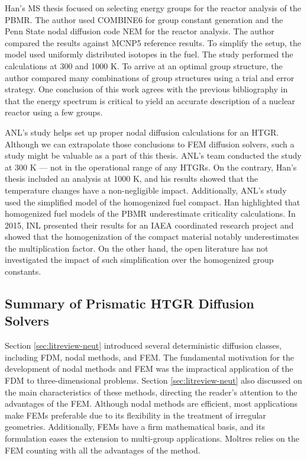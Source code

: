 Han's MS thesis \cite{han_sensitivity_2008} focused on selecting energy groups for the reactor analysis of the \gls{PBMR}.
The author used COMBINE6 \cite{grimesey_combinepc-portable_1994} for group constant generation and the Penn State nodal diffusion code NEM \cite{bandini_three-dimensional_1990} for the reactor analysis.
The author compared the results against MCNP5 reference results.
To simplify the setup, the model used uniformly distributed isotopes in the fuel.
The study performed the calculations at 300 and 1000 K.
To arrive at an optimal group structure, the author compared many combinations of group structures using a trial and error strategy.
One conclusion of this work agrees with the previous bibliography \cite{gulf_oil_company_nuclear_1973} \cite{duderstadt_nuclear_1976} in that the energy spectrum is critical to yield an accurate description of a nuclear reactor using a few groups.

ANL's study helps set up proper nodal diffusion calculations for an \gls{HTGR}.
Although we can extrapolate those conclusions to \gls{FEM} diffusion solvers, such a study might be valuable as a part of this thesis.
ANL's team conducted the study at 300 K --- not in the operational range of any \glspl{HTGR}.
On the contrary, Han's thesis included an analysis at 1000 K, and his results showed that the temperature changes have a non-negligible impact.
Additionally, ANL's study used the simplified model of the homogenized fuel compact.
Han highlighted that homogenized fuel models of the \gls{PBMR} underestimate criticality calculations.
In 2015, \gls{INL} presented their results \cite{strydom_results_2015} for an \gls{IAEA} coordinated research project \cite{tyobeka_htgr_2011} and showed that the homogenization of the compact material notably underestimates the multiplication factor.
On the other hand, the open literature has not investigated the impact of such simplification over the homogenized group constants.

\subsection{Summary of Prismatic HTGR Diffusion Solvers}

Section \ref{sec:litreview-neut} introduced several deterministic diffusion classes, including FDM, nodal methods, and FEM.
The fundamental motivation for the development of nodal methods and FEM was the impractical application of the \gls{FDM} to three-dimensional problems.
Section \ref{sec:litreview-neut} also discussed on the main characteristics of these methods, directing the reader's attention to the advantages of the FEM.
Although nodal methods are efficient, most applications make FEMs preferable due to its flexibility in the treatment of irregular geometries.
Additionally, FEMs have a firm mathematical basis, and its formulation eases the extension to multi-group applications.
Moltres relies on the FEM counting with all the advantages of the method.

